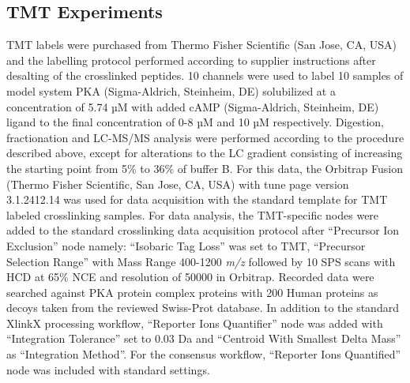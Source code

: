 \subsection{TMT Experiments}
TMT labels were purchased from Thermo Fisher Scientific (San Jose, CA, USA) and the labelling protocol performed according to supplier instructions after desalting of the crosslinked peptides. 10 channels were used to label 10 samples of model system PKA (Sigma-Aldrich, Steinheim, DE) solubilized at a concentration of 5.74 µM with added cAMP (Sigma-Aldrich, Steinheim, DE) ligand to the final concentration of 0-8 µM and 10 µM respectively. Digestion, fractionation and LC-MS/MS analysis were performed according to the procedure described above, except for alterations to the LC gradient consisting of increasing the starting point from 5\% to 36\% of buffer B. For this data, the Orbitrap Fusion (Thermo Fisher Scientific, San Jose, CA, USA) with tune page version 3.1.2412.14 was used for data acquisition with the standard template for TMT labeled crosslinking samples. For data analysis, the TMT-specific nodes were added to the standard crosslinking data acquisition protocol \cite{klykov2018efficient} after “Precursor Ion Exclusion” node namely: “Isobaric Tag Loss” was set to TMT, “Precursor Selection Range” with Mass Range 400-1200 \emph{m/z} followed by 10 SPS scans with HCD at 65\% NCE and resolution of 50000 in Orbitrap. Recorded data were searched against PKA protein complex proteins with 200 Human proteins as decoys taken from the reviewed Swiss-Prot database. In addition to the standard XlinkX processing workflow, “Reporter Ions Quantifier” node was added with “Integration Tolerance” set to 0.03 Da and “Centroid With Smallest Delta Mass” as “Integration Method”. For the consensus workflow, “Reporter Ions Quantified” node was included with standard settings.
